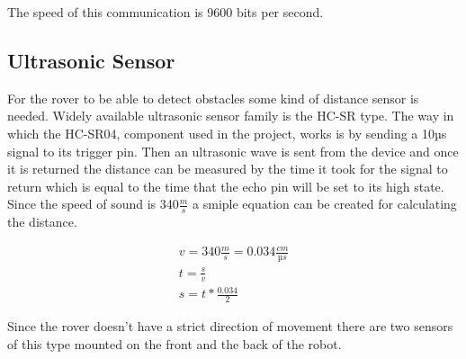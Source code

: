The speed of this communication is 9600 bits per second.

\subsection{Ultrasonic Sensor}

For the rover to be able to detect obstacles some kind of distance sensor is needed. Widely available ultrasonic sensor family is the HC-SR type. The way in which the HC-SR04, component used in the project, works is by sending a 10µs signal to its trigger pin. Then an ultrasonic wave is sent from the device and once it is returned the distance can be measured by the time it took for the signal to return which is equal to the time that the echo pin will be set to its high state.\cite{HC-SR03} Since the speed of sound is 340$\frac{m}{s}$ a smiple equation can be created for calculating the distance.

\begin{gather}
    v = 340\frac{m}{s} = 0.034 \frac{cm}{\text{µ}s}\\
    t = \frac{s}{v}\\
    s = t * \frac{0.034}{2}
\end{gather}

Since the rover doesn't have a strict direction of movement there are two sensors of this type mounted on the front and the back of the robot.